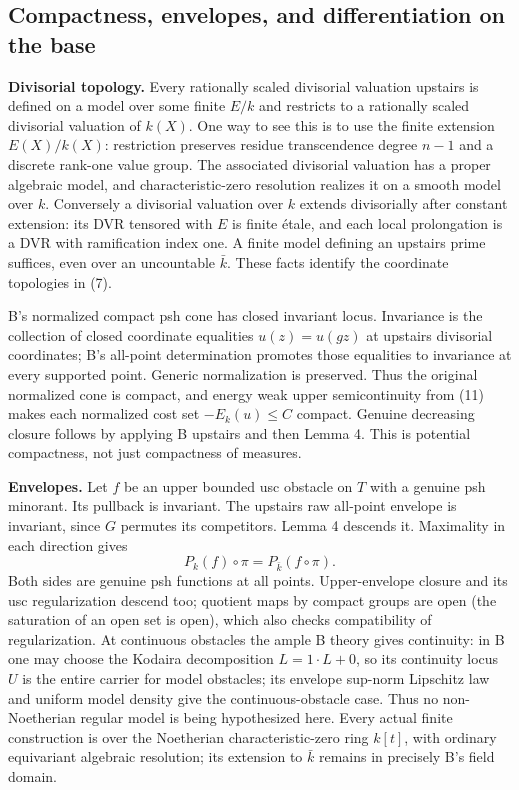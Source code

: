 \documentclass[
  11pt,
]{article}
\begin{document}
\subsection{Compactness, envelopes, and differentiation on the
base}\label{compactness-envelopes-and-differentiation-on-the-base}

\textbf{Divisorial topology.} Every rationally scaled divisorial
valuation upstairs is defined on a model over some finite \(E/k\) and
restricts to a rationally scaled divisorial valuation of \(k(X)\). One
way to see this is to use the finite extension \(E(X)/k(X)\):
restriction preserves residue transcendence degree \(n-1\) and a
discrete rank-one value group. The associated divisorial valuation has a
proper algebraic model, and characteristic-zero resolution realizes it
on a smooth model over \(k\). Conversely a divisorial valuation over
\(k\) extends divisorially after constant extension: its DVR tensored
with \(E\) is finite étale, and each local prolongation is a DVR with
ramification index one. A finite model defining an upstairs prime
suffices, even over an uncountable \(\bar k\). These facts identify the
coordinate topologies in (7).

B's normalized compact psh cone has closed invariant locus. Invariance
is the collection of closed coordinate equalities \(u(z)=u(gz)\) at
upstairs divisorial coordinates; B's all-point determination promotes
those equalities to invariance at every supported point. Generic
normalization is preserved. Thus the original normalized cone is
compact, and energy weak upper semicontinuity from (11) makes each
normalized cost set \(-E_k(u)\leq C\) compact. Genuine decreasing
closure follows by applying B upstairs and then Lemma 4. This is
potential compactness, not just compactness of measures.

\textbf{Envelopes.} Let \(f\) be an upper bounded usc obstacle on \(T\)
with a genuine psh minorant. Its pullback is invariant. The upstairs raw
all-point envelope is invariant, since \(G\) permutes its competitors.
Lemma 4 descends it. Maximality in each direction gives \[
 P_k(f)\circ\pi=P_{\bar k}(f\circ\pi).
 \tag{15}
\] Both sides are genuine psh functions at all points. Upper-envelope
closure and its usc regularization descend too; quotient maps by compact
groups are open (the saturation of an open set is open), which also
checks compatibility of regularization. At continuous obstacles the
ample B theory gives continuity: in B one may choose the Kodaira
decomposition \(L=1\cdot L+0\), so its continuity locus \(U\) is the
entire carrier for model obstacles; its envelope sup-norm Lipschitz law
and uniform model density give the continuous-obstacle case. Thus no
non-Noetherian regular model is being hypothesized here. Every actual
finite construction is over the Noetherian characteristic-zero ring
\(k[t]\), with ordinary equivariant algebraic resolution; its extension
to \(\bar k\) remains in precisely B's field domain.
\end{document}
